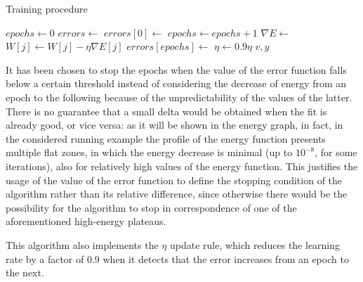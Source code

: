 \documentclass[letterpaper,headings=standardclasses]{scrartcl}
\begin{document}
\begin{algorithm}[h]
    \caption{Training procedure}
    \label{tralg}
    \begin{algorithmic}
    
        \State {}
        \State $epochs \gets 0$
        \State $errors \gets $ 
        \State $errors[0] \gets $ 
        \State {}
            \State $epochs \gets epochs + 1$
            \State {}
                \State $\nabla E \gets $ 
                    \State $W[j] \gets W[j] - \eta \nabla E[j]$
                \EndFor
            \EndFor
            \State {}
            \State $errors[epochs] \gets $ 
            \State {}
                \State $\eta \gets 0.9 \eta$
            \EndIf
        \EndWhile
        \State \Return $v, y$
    \EndFunction
    
    \end{algorithmic}
\end{algorithm}

It has been chosen to stop the epochs when the value of the error function falls below a certain threshold instead of considering the decrease of energy from an epoch to the following because of the unpredictability of the values of the latter. There is no guarantee that a small delta would be obtained when the fit is already good, or vice versa: as it will be shown in the energy graph, in fact, in the considered running example the profile of the energy function presents multiple flat zones, in which the energy decrease is minimal (up to $10^{-8}$, for some iterations), also for relatively high values of the energy function. This justifies the usage of the value of the error function to define the stopping condition of the algorithm rather than its relative difference, since otherwise there would be the possibility for the algorithm to stop in correspondence of one of the aforementioned high-energy plateaus.

This algorithm also implements the $\eta$ update rule, which reduces the learning rate by a factor of 0.9 when it detects that the error increases from an epoch to the next.
\end{document}
